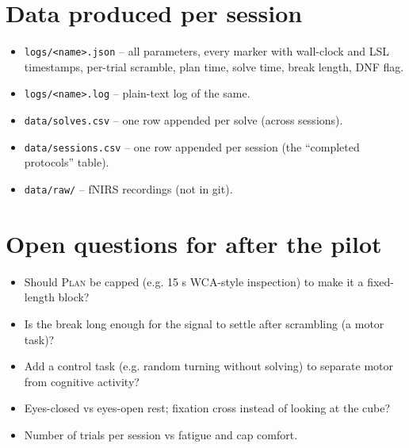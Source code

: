 \documentclass[11pt,a4paper]{article}
\begin{document}
\section{Data produced per session}
\begin{itemize}[nosep]
  \item \texttt{logs/<name>.json} -- all parameters, every marker with wall-clock and LSL
        timestamps, per-trial scramble, plan time, solve time, break length, DNF flag.
  \item \texttt{logs/<name>.log} -- plain-text log of the same.
  \item \texttt{data/solves.csv} -- one row appended per solve (across sessions).
  \item \texttt{data/sessions.csv} -- one row appended per session (the ``completed protocols'' table).
  \item \texttt{data/raw/} -- fNIRS recordings (not in git).
\end{itemize}

\section{Open questions for after the pilot}
\begin{itemize}[nosep]
  \item Should \textsc{Plan} be capped (e.g. 15 s WCA-style inspection) to make it a fixed-length block?
  \item Is the break long enough for the signal to settle after scrambling (a motor task)?
  \item Add a control task (e.g. random turning without solving) to separate motor from cognitive activity?
  \item Eyes-closed vs eyes-open rest; fixation cross instead of looking at the cube?
  \item Number of trials per session vs fatigue and cap comfort.
\end{itemize}
\end{document}
